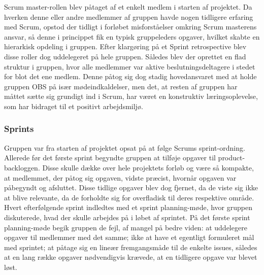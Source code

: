 Scrum master-rollen blev påtaget af et enkelt medlem i starten af projektet. Da hverken denne eller andre medlemmer af gruppen havde nogen tidligere erfaring 
med Scrum, opstod der tidligt i forløbet misforståelser omkring Scrum masterens ansvar, så denne i princippet fik en typisk gruppeleders opgaver, hvilket 
skabte en hierarkisk opdeling i gruppen. Efter klargøring på et Sprint retrospective blev disse roller dog uddelegeret på hele gruppen. Således blev der 
oprettet en flad struktur i gruppen, hvor alle medlemmer var aktive beslutningsdeltagere i stedet for blot det ene medlem. Denne påtog sig dog stadig 
hovedansvaret med at holde gruppen
OBS på især mødeindkaldelser, men det, at resten af gruppen har måttet sætte sig grundigt ind i Scrum, har været en konstruktiv læringsoplevelse, som har
bidraget til et positivt arbejdsmiljø.

\subsubsection{Sprints}
Gruppen var fra starten af projektet opsat på at følge Scrums sprint-ordning. Allerede før det første sprint begyndte gruppen at tilføje opgaver til 
product-backloggen. Disse skulle dække over hele projektets forløb og være så kompakte, at medlemmet, der påtog sig opgaven, vidste præcist, hvornår opgaven 
var påbegyndt og afsluttet. Disse tidlige opgaver blev dog fjernet, da de viste sig ikke at blive relevante, da de forholdte sig for overfladisk til deres 
respektive område. Hvert efterfølgende sprint indledtes med et sprint planning-møde, hvor gruppen diskuterede, hvad der skulle arbejdes på i løbet af sprintet.
 På det første sprint planning-møde begik gruppen de fejl, af mangel på bedre viden: at uddelegere opgaver til medlemmer med det samme; ikke at have et 
 egentligt formuleret mål med sprintet; at påtage sig en lineær fremgangsmåde til de enkelte issues, således at en lang række opgaver nødvendigvis krævede, 
 at en tidligere opgave var blevet løst.

